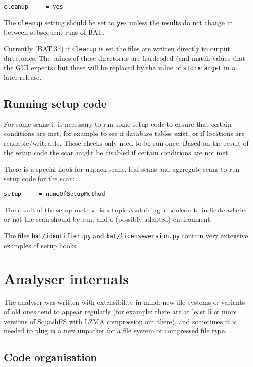 \documentclass[10pt,a4paper]{article}
\begin{document}
\begin{verbatim}
cleanup     = yes
\end{verbatim}

The \texttt{cleanup} setting should be set to \texttt{yes} unless the results
do not change in between subsequent runs of BAT.

Currently (BAT 37) if \texttt{cleanup} is set the files are written directly to
output directories. The values of these directories are hardcoded (and match
values that the GUI expects) but these will be replaced by the value of
\texttt{storetarget} in a later release.

\subsection{Running setup code}

For some scans it is necessary to run some setup code to ensure that certain
conditions are met, for example to see if database tables exist, or if locations
are readable/writeable. These checks only need to be run once. Based on the
result of the setup code the scan might be disabled if certain conditions are
not met.

There is a special hook for unpack scans, leaf scans and aggregate scans to run
setup code for the scan:

\begin{verbatim}
setup     = nameOfSetupMethod
\end{verbatim}

The result of the setup method is a tuple containing a boolean to indicate
wheter or not the scan should be run, and a (possibly adapted) environment.

The files \texttt{bat/identifier.py} and \texttt{bat/licenseversion.py} contain
very extensive examples of setup hooks.

\section{Analyser internals}

The analyser was written with extensibility in mind: new file systems or
variants of old ones tend to appear regularly (for example: there are at
least 5 or more versions of SquashFS with LZMA compression out there), and
sometimes it is needed to plug in a new unpacker for a file system or
compressed file type.

\subsection{Code organisation}
\end{document}
